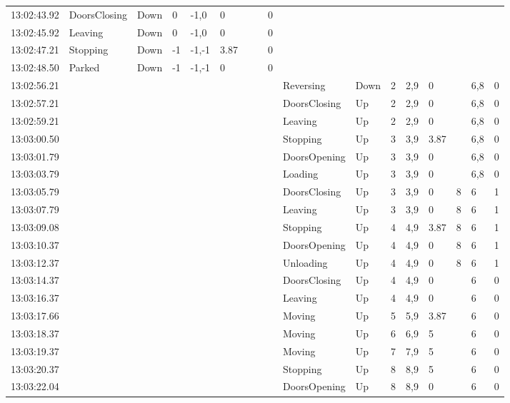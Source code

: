 \documentclass{UoYCSproject}
\begin{document}
\begin{landscape}
\begin{longtable}{l || l | l | l | l | l | l | l | l || l | l | l | l | l | l | l | l}
	13:02:43.92 & DoorsClosing & Down & 0 & -1,0 & 0 &  &  & 0 &  &  &  &  &  &  &  &  \\
	13:02:45.92 & Leaving & Down & 0 & -1,0 & 0 &  &  & 0 &  &  &  &  &  &  &  &  \\
	13:02:47.21 & Stopping & Down & -1 & -1,-1 & 3.87 &  &  & 0 &  &  &  &  &  &  &  &  \\
	13:02:48.50 & Parked & Down & -1 & -1,-1 & 0 &  &  & 0 &  &  &  &  &  &  &  &  \\
	13:02:56.21 &  &  &  &  &  &  &  &  & Reversing & Down & 2 & 2,9 & 0 &  & 6,8 & 0 \\
	13:02:57.21 &  &  &  &  &  &  &  &  & DoorsClosing & Up & 2 & 2,9 & 0 &  & 6,8 & 0 \\
	13:02:59.21 &  &  &  &  &  &  &  &  & Leaving & Up & 2 & 2,9 & 0 &  & 6,8 & 0 \\
	13:03:00.50 &  &  &  &  &  &  &  &  & Stopping & Up & 3 & 3,9 & 3.87 &  & 6,8 & 0 \\
	13:03:01.79 &  &  &  &  &  &  &  &  & DoorsOpening & Up & 3 & 3,9 & 0 &  & 6,8 & 0 \\
	13:03:03.79 &  &  &  &  &  &  &  &  & Loading & Up & 3 & 3,9 & 0 &  & 6,8 & 0 \\
	13:03:05.79 &  &  &  &  &  &  &  &  & DoorsClosing & Up & 3 & 3,9 & 0 & 8 & 6 & 1 \\
	13:03:07.79 &  &  &  &  &  &  &  &  & Leaving & Up & 3 & 3,9 & 0 & 8 & 6 & 1 \\
	13:03:09.08 &  &  &  &  &  &  &  &  & Stopping & Up & 4 & 4,9 & 3.87 & 8 & 6 & 1 \\
	13:03:10.37 &  &  &  &  &  &  &  &  & DoorsOpening & Up & 4 & 4,9 & 0 & 8 & 6 & 1 \\
	13:03:12.37 &  &  &  &  &  &  &  &  & Unloading & Up & 4 & 4,9 & 0 & 8 & 6 & 1 \\
	13:03:14.37 &  &  &  &  &  &  &  &  & DoorsClosing & Up & 4 & 4,9 & 0 &  & 6 & 0 \\
	13:03:16.37 &  &  &  &  &  &  &  &  & Leaving & Up & 4 & 4,9 & 0 &  & 6 & 0 \\
	13:03:17.66 &  &  &  &  &  &  &  &  & Moving & Up & 5 & 5,9 & 3.87 &  & 6 & 0 \\
	13:03:18.37 &  &  &  &  &  &  &  &  & Moving & Up & 6 & 6,9 & 5 &  & 6 & 0 \\
	13:03:19.37 &  &  &  &  &  &  &  &  & Moving & Up & 7 & 7,9 & 5 &  & 6 & 0 \\
	13:03:20.37 &  &  &  &  &  &  &  &  & Stopping & Up & 8 & 8,9 & 5 &  & 6 & 0 \\
	13:03:22.04 &  &  &  &  &  &  &  &  & DoorsOpening & Up & 8 & 8,9 & 0 &  & 6 & 0 \\

\end{longtable}
\end{landscape}
\end{document}
